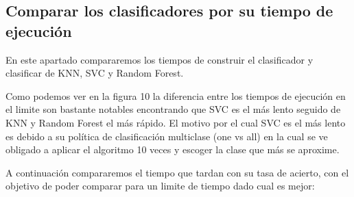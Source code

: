 \documentclass[8pt,a4paper]{article}
\begin{document}
\subsection{Comparar los clasificadores por su tiempo de ejecución}

En este apartado compararemos los tiempos de construir el clasificador y clasificar de KNN, SVC y Random Forest.



Como podemos ver en la figura 10 la diferencia entre los tiempos de ejecución en el limite son bastante notables encontrando que SVC es el más lento seguido de KNN y Random Forest el más rápido. El motivo por el cual SVC es el más lento es debido a su política de clasificación multiclase (one vs all) en la cual se ve obligado a aplicar el algoritmo 10 veces y escoger la clase que más se aproxime.

A continuación compararemos el tiempo que tardan con su tasa de acierto, con el objetivo de poder comparar para un limite de tiempo dado cual es mejor:
\end{document}
